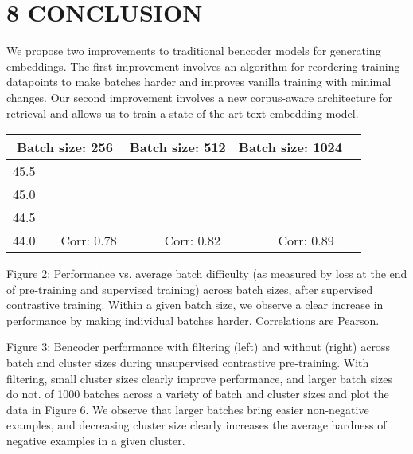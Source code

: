 \section*{8 CONCLUSION}
We propose two improvements to traditional bencoder models for generating embeddings. The first improvement involves an algorithm for reordering training datapoints to make batches harder and improves vanilla training with minimal changes. Our second improvement involves a new corpus-aware architecture for retrieval and allows us to train a state-of-the-art text embedding model.

\begin{tabular}{|c|c|c|c|c|c|c|c|c|c|}
\hline \multicolumn{3}{|c|}{ Batch size: 256} & \multicolumn{3}{|c|}{ Batch size: 512} & \multicolumn{3}{|c|}{ Batch size: 1024} \\
\hline 45.5 & & & & & & & & & \\
\hline 45.0 & & & & & & & & & \\
\hline 44.5 & & & & & & & & & \\
\hline 44.0 & & Corr: 0.78 & & & Corr: 0.82 & & & Corr: 0.89 & \\
\hline
\end{tabular}

Figure 2: Performance vs. average batch difficulty (as measured by loss at the end of pre-training and supervised training) across batch sizes, after supervised contrastive training. Within a given batch size, we observe a clear increase in performance by making individual batches harder. Correlations are Pearson.

Figure 3: Bencoder performance with filtering (left) and without (right) across batch and cluster sizes during unsupervised contrastive pre-training. With filtering, small cluster sizes clearly improve performance, and larger batch sizes do not.
of 1000 batches across a variety of batch and cluster sizes and plot the data in Figure 6. We observe that larger batches bring easier non-negative examples, and decreasing cluster size clearly increases the average hardness of negative examples in a given cluster.

